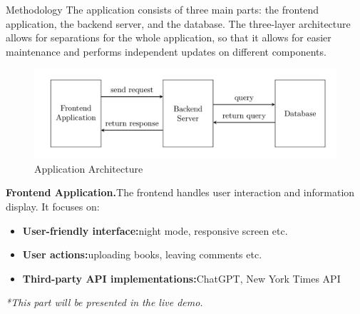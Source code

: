 \begin{block}{Methodology}
The application consists of three main parts: the frontend application, the backend server, and the database. The three-layer architecture allows for separations for the whole application, so that it allows for easier maintenance and performs independent updates on different components.\\
\begin{figure}
\includegraphics[width=0.8\linewidth]{app_architecture.png}
\caption{Application Architecture}
\end{figure}
\vspace{-1.0cm}
\textbf{Frontend Application.\space}The frontend handles user interaction and information display. It focuses on:
\begin{itemize}
    \item \textbf{User-friendly interface:\space}night mode, responsive screen etc.
    \item \textbf{User actions:\space}uploading books, leaving comments etc.
    \item \textbf{Third-party API implementations:\space}ChatGPT, New York Times API
\end{itemize}
\textit{\small**This part will be presented in the live demo.}\\

\end{block}
